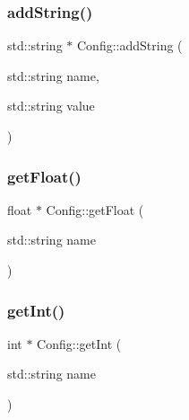 \hypertarget{class_mason_1_1_config_a426f9e3f5de94a89dadfb7531d3b1d39}{}\label{class_mason_1_1_config_a426f9e3f5de94a89dadfb7531d3b1d39} 
\subsubsection{\texorpdfstring{add\+String()}{addString()}}
{\footnotesize\ttfamily std\+::string $\ast$ Config\+::add\+String (\begin{DoxyParamCaption}\item[{std\+::string}]{name,  }\item[{std\+::string}]{value }\end{DoxyParamCaption})\hspace{0.3cm}{\ttfamily [static]}}

\hypertarget{class_mason_1_1_config_a0e95110c092d4d3617a54a3ab3e4f70a}{}\label{class_mason_1_1_config_a0e95110c092d4d3617a54a3ab3e4f70a} 
\subsubsection{\texorpdfstring{get\+Float()}{getFloat()}}
{\footnotesize\ttfamily float $\ast$ Config\+::get\+Float (\begin{DoxyParamCaption}\item[{std\+::string}]{name }\end{DoxyParamCaption})\hspace{0.3cm}{\ttfamily [static]}}

\hypertarget{class_mason_1_1_config_aafb3b1eb520c81f3002d4aa78e400ea0}{}\label{class_mason_1_1_config_aafb3b1eb520c81f3002d4aa78e400ea0} 
\subsubsection{\texorpdfstring{get\+Int()}{getInt()}}
{\footnotesize\ttfamily int $\ast$ Config\+::get\+Int (\begin{DoxyParamCaption}\item[{std\+::string}]{name }\end{DoxyParamCaption})\hspace{0.3cm}{\ttfamily [static]}}

